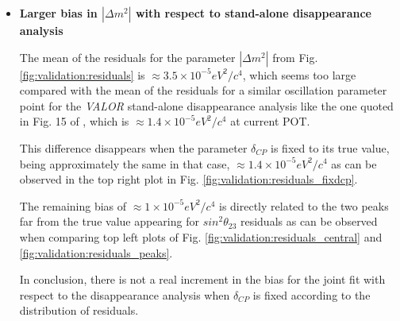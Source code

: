 \begin{itemize}
\item{\textbf{Larger bias in $|\Delta m^{2}|$ with respect to stand-alone disappearance analysis}

The mean of the residuals for the parameter $|\Delta m^{2}|$ from Fig. \ref{fig:validation:residuals}
is $\approx 3.5 \times 10^{-5} eV^{2}/c^{4}$, which seems too large compared with the mean of the
residuals for a similar oscillation parameter point for the \textit{VALOR} stand-alone disappearance
analysis like the one quoted in Fig. 15 of \cite{OurRun1234DisappAnalysis3Flavour}, which is $\approx 1.4 \times 10^{-5} eV^{2}/c^{4}$
at current POT. 

This difference disappears when the parameter $\delta_{CP}$ is fixed to its true value, being approximately
the same in that case, $\approx 1.4 \times 10^{-5} eV^{2}/c^{4}$ as can be observed in the top right plot
in Fig. \ref{fig:validation:residuals_fixdcp}. 

The remaining bias of $\approx 1 \times 10^{-5} eV^{2}/c^{4}$ is directly related to the two peaks
far from the true value appearing for $sin^{2}\theta_{23}$ residuals as can be observed when comparing
top left plots of Fig. \ref{fig:validation:residuals_central} and \ref{fig:validation:residuals_peaks}.


In conclusion, there is not a real increment in the bias for the joint fit with respect to the disappearance analysis when
$\delta_{CP}$ is fixed according to the distribution of residuals.%
}

\end{itemize}





